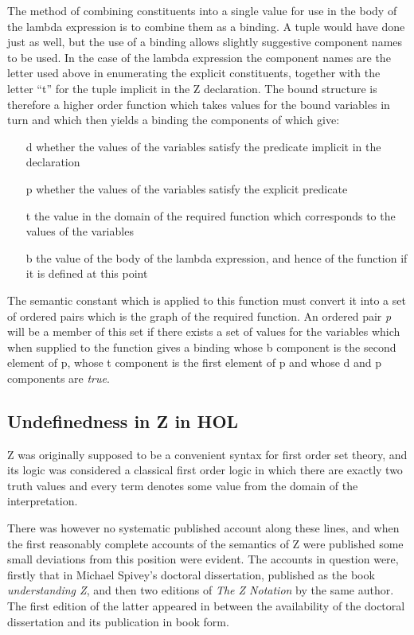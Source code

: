 \documentclass[10pt,titlepage]{book}
\begin{document}
The method of combining constituents into a single value for use in the body of the lambda expression is to combine them as a binding.
A tuple would have done just as well, but the use of a binding allows slightly suggestive component names to be used.
In the case of the lambda expression the component names are the letter used above in enumerating the explicit constituents, together with the letter ``t'' for the tuple implicit in the Z declaration.
The bound structure is therefore a higher order function which takes values for the bound variables in turn and which then yields a binding the components of which give:

\begin{itemize}
\item[d] whether the values of the variables satisfy the predicate implicit in the declaration
\item[p] whether the values of the variables satisfy the explicit predicate
\item[t] the value in the domain of the required function which corresponds to the values of the variables
\item[b] the value of the body of the lambda expression, and hence of the function if it is defined at this point
\end{itemize}

The semantic constant which is applied to this function must convert it into a set of ordered pairs which is the graph of the required function.
An ordered pair {\it p} will be a member of this set if there exists a set of values for the variables which when supplied to the function gives a binding whose b component is the second element of p, whose t component is the first element of p and whose d and p components are {\it true}.

\subsection{Undefinedness in Z in HOL}

Z was originally supposed to be a convenient syntax for first order set theory, and its logic was considered a classical first order logic in which there are exactly two truth values and every term denotes some value from the domain of the interpretation.

There was however no systematic published account along these lines, and when the first reasonably complete accounts of the semantics of Z were published some small deviations from this position were evident.
The accounts in question were, firstly that in Michael Spivey's doctoral dissertation, published as the book {\it understanding Z}\cite{spivey88}, and then two editions of {\it The Z Notation}\cite{spivey89} by the same author.
The first edition of the latter appeared in between the availability of the doctoral dissertation and its publication in book form.
\end{document}
